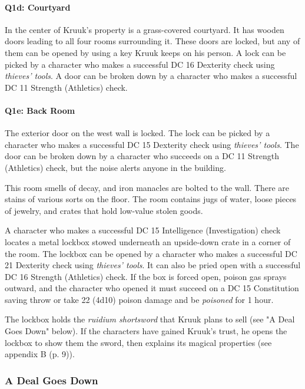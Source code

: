 \documentclass[a4paper, 11pt, bg=full, twocolumn, nooutline]{dndbook}
\begin{document}
\paragraph{Q1d: Courtyard}

In the center of Kruuk's property is a grass-covered courtyard. It has wooden doors leading to all four rooms surrounding it. These doors are locked, but any of them can be opened by using a key Kruuk keeps on his person. A lock can be picked by a character who makes a successful DC 16 Dexterity check using \textit{thieves' tools}. A door can be broken down by a character who makes a successful DC 11 Strength (Athletics) check.

\paragraph{Q1e: Back Room}

The exterior door on the west wall is locked. The lock can be picked by a character who makes a successful DC 15 Dexterity check using \textit{thieves' tools}. The door can be broken down by a character who succeeds on a DC 11 Strength (Athletics) check, but the noise alerts anyone in the building.

This room smells of decay, and iron manacles are bolted to the wall. There are stains of various sorts on the floor. The room contains jugs of water, loose pieces of jewelry, and crates that hold low-value stolen goods.

A character who makes a successful DC 15 Intelligence (Investigation) check locates a metal lockbox stowed underneath an upside-down crate in a corner of the room. The lockbox can be opened by a character who makes a successful DC 21 Dexterity check using \textit{thieves' tools}. It can also be pried open with a successful DC 16 Strength (Athletics) check. If the box is forced open, poison gas sprays outward, and the character who opened it must succeed on a DC 15 Constitution saving throw or take 22 (4d10) poison damage and be \textit{poisoned} for 1 hour.

The lockbox holds the \textit{ruidium shortsword} that Kruuk plans to sell (see "A Deal Goes Down" below). If the characters have gained Kruuk's trust, he opens the lockbox to show them the sword, then explains its magical properties (see appendix B (p. 9)).

\subsubsection{A Deal Goes Down}
\end{document}
